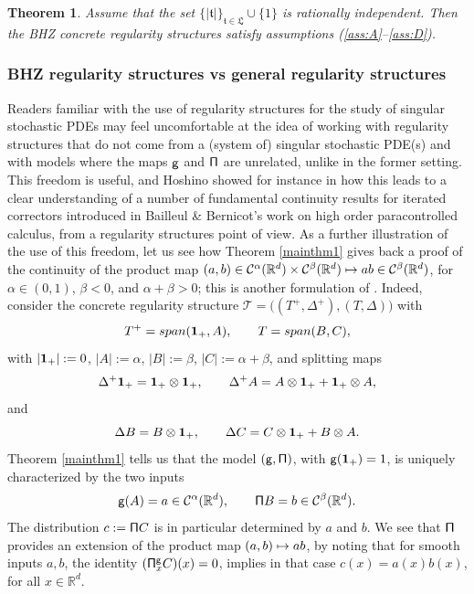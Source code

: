\documentclass[11pt]{article}
\numberwithin{equation}{section}
\newcommand\mto{\mathchoice{\longmapsto}{\mapsto}{\mapsto}{\mapsto}}
\theoremstyle{plain}
\newtheorem{thm}{Theorem}
\theoremstyle{definition}
\newcommand{\bbR}{\mathbb{R}}
\newcommand{\mcC}{\mathcal{C}}
\begin{document}
\begin{thm} \label{mainthm3}
Assume that the set $\{|\mathfrak{t}|\}_{\mathfrak{t}\in\mathfrak{L}}\cup\{1\}$ is rationally independent. Then the \emph{BHZ} concrete regularity structures satisfy assumptions \textup{(\ref{ass:A}--\ref{ass:D})}.
\end{thm}

\subsubsection*{BHZ regularity structures vs general regularity structures}
Readers familiar with the use of regularity structures for the study of singular stochastic PDEs may feel uncomfortable at the idea of working with regularity structures that do not come from a (system of) singular stochastic PDE(s) and with models where the maps $\sf g$ and $\sf\Pi$ are unrelated, unlike in the former setting. This freedom is useful, and Hoshino showed for instance in \cite{HoshinoCommutator1, HoshinoCommutator2} how this leads to a clear understanding of a number of fundamental continuity results for iterated correctors introduced in Bailleul \& Bernicot's work \cite{BB16} on high order paracontrolled calculus, from a regularity structures point of view. As a further illustration of the use of this freedom, let us see how Theorem \ref{mainthm1} gives back a proof of the continuity of the product map $(a,b)\in \mcC^\alpha(\bbR^d)\times \mcC^\beta(\bbR^d) \mto ab\in \mcC^\beta(\bbR^d)$, for $\alpha\in(0,1)$, $\beta<0$, and $\alpha+\beta>0$; this is another formulation of \cite[Prop.\,4.14]{Hai}.
Indeed, consider the concrete regularity structure $\mathscr{T}=\bigl((T^+,\Delta^+), (T,\Delta)\bigr)$ with
\[
T^+ = \textrm{span}({\bf 1}_+, A), \qquad T = \textrm{span}(B,C),
\]
with $\vert{\bf1}_+\vert:=0$, $\vert A\vert:=\alpha$, $\vert B\vert:=\beta$, $\vert C\vert:=\alpha+\beta$, and splitting maps
\[
\Delta^+{\bf 1}_+ = {\bf 1}_+\otimes {\bf 1}_+, \qquad \Delta^+A = A\otimes{\bf 1}_+ + {\bf 1}_+\otimes A,
\]
and
\[
\Delta B = B\otimes {\bf 1}_+, \qquad \Delta C = C\otimes{\bf 1}_+ + B\otimes A.
\]
Theorem \ref{mainthm1} tells us that the model $\sf (g,\Pi)$, with ${\sf g}({\bf 1}_+)=1$, is uniquely characterized by the two inputs
\[
{\sf g}(A) = a\in \mcC^\alpha(\bbR^d), \qquad {\sf \Pi}B = b\in \mcC^\beta(\bbR^d).
\]
The distribution $c:={\sf \Pi}C$ is in particular determined by $a$ and $b$. We see that $\sf \Pi$ provides an extension of the product map $(a,b)\mto ab$, by noting that for smooth inputs $a,b$, the identity $({\sf \Pi}_x^{\sf g}C)(x)=0$, implies in that case $c(x)=a(x)b(x)$, for all $x\in\bbR^d$.
\end{document}
